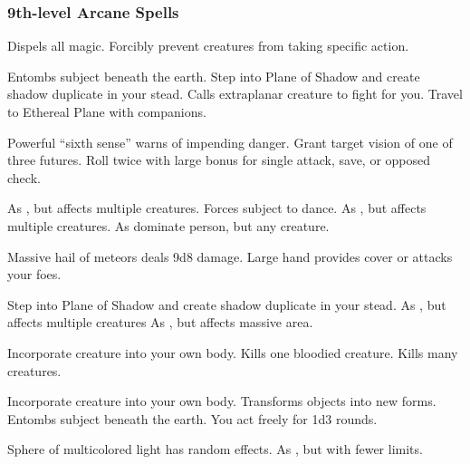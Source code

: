 \subsubsection{9th-level Arcane Spells} 
\begin{swspelllist}
     Dispels all magic.
     Forcibly prevent creatures from taking specific action.

     Entombs subject beneath the earth.
     Step into Plane of Shadow and create shadow duplicate in your stead.
     Calls extraplanar creature to fight for you.
     Travel to Ethereal Plane with companions.

     Powerful ``sixth sense'' warns of impending danger.
     Grant target vision of one of three futures.
     Roll twice with large bonus for single attack, save, or opposed check.

     As , but affects multiple creatures.
     Forces subject to dance.
     As , but affects multiple creatures.
     As dominate person, but any creature.

     Massive hail of meteors deals 9d8 damage.
    \spellhead{}
     Large hand provides cover or attacks your foes.

     Step into Plane of Shadow and create shadow duplicate in your stead.
     As , but affects multiple creatures
     As , but affects massive area.

     Incorporate creature into your own body.
     Kills one bloodied creature.
     Kills many creatures.

     Incorporate creature into your own body.
     Transforms objects into new forms.
     Entombs subject beneath the earth.
     You act freely for 1d3 rounds.

     Sphere of multicolored light has random effects.
    \M As , but with fewer limits.
\end{swspelllist}

